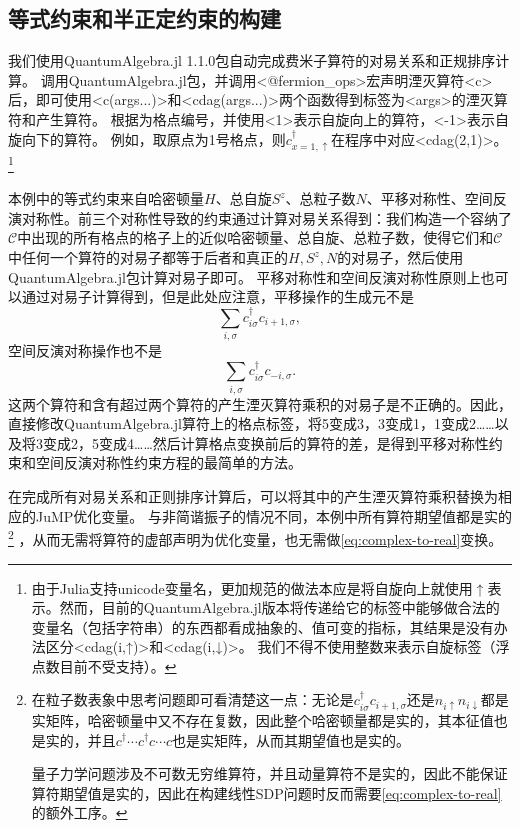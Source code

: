 \documentclass[oneside]{fduthesis}
\def\texttt#1{<#1>}%
\begin{document}
\subsection{等式约束和半正定约束的构建}\label{sec:symbolic-hubbard}

我们使用QuantumAlgebra.jl 1.1.0包\cite{Sanchez-Barquilla2020,QuantumAlgebra.jl}自动完成费米子算符的对易关系和正规排序计算。
调用QuantumAlgebra.jl包，并调用\texttt{@fermion\_ops}宏声明湮灭算符\texttt{c}后，即可使用\texttt{c(args...)}和\texttt{cdag(args...)}两个函数得到标签为\texttt{args}的湮灭算符和产生算符。
根据为格点编号，并使用\texttt{1}表示自旋向上的算符，\texttt{-1}表示自旋向下的算符。
例如，取原点为1号格点，则$c^\dagger_{x = 1, \uparrow}$在程序中对应\texttt{cdag(2,1)}。%
\footnote{
    由于Julia支持unicode变量名，更加规范的做法本应是将自旋向上就使用$\uparrow$表示。然而，目前的QuantumAlgebra.jl版本将传递给它的标签中能够做合法的变量名（包括字符串）的东西都看成抽象的、值可变的指标，其结果是没有办法区分\texttt{cdag(i,↑)}和\texttt{cdag(i,↓)}。
    我们不得不使用整数来表示自旋标签（浮点数目前不受支持）。
}%

本例中的等式约束来自哈密顿量$H$、总自旋$S^z$、总粒子数$N$、平移对称性、空间反演对称性。前三个对称性导致的约束通过计算对易关系得到：我们构造一个容纳了$\mathcal{C}$中出现的所有格点的格子上的近似哈密顿量、总自旋、总粒子数，使得它们和$\mathcal{C}$中任何一个算符的对易子都等于后者和真正的$H, S^z, N$的对易子，然后使用QuantumAlgebra.jl包计算对易子即可。
平移对称性和空间反演对称性原则上也可以通过对易子计算得到，但是此处应注意，平移操作的生成元不是
\[
    \sum_{i, \sigma} c^\dagger_{i \sigma} c_{i + 1, \sigma},
\]
空间反演对称操作也不是
\[
    \sum_{i, \sigma} c^\dagger_{i \sigma} c_{-i, \sigma}.
\]
这两个算符和含有超过两个算符的产生湮灭算符乘积的对易子是不正确的。因此，直接修改QuantumAlgebra.jl算符上的格点标签，将5变成3，3变成1，1变成2……以及将3变成2，5变成4……然后计算格点变换前后的算符的差，是得到平移对称性约束和空间反演对称性约束方程的最简单的方法。

在完成所有对易关系和正则排序计算后，可以将其中的产生湮灭算符乘积替换为相应的JuMP优化变量。
与非简谐振子的情况不同，本例中所有算符期望值都是实的%
\footnote{
    在粒子数表象中思考问题即可看清楚这一点：无论是$c^\dagger_{i \sigma} c_{i + 1, \sigma}$还是$n_{i \uparrow} n_{i \downarrow}$都是实矩阵，哈密顿量中又不存在复数，因此整个哈密顿量都是实的，其本征值也是实的，并且$c^\dagger \cdots c^\dagger c \cdots c$也是实矩阵，从而其期望值也是实的。

    量子力学问题涉及不可数无穷维算符，并且动量算符不是实的，因此不能保证算符期望值是实的，因此在构建线性SDP问题时反而需要\eqref{eq:complex-to-real}的额外工序。
}%
，从而无需将算符的虚部声明为优化变量，也无需做\eqref{eq:complex-to-real}变换。
\end{document}
